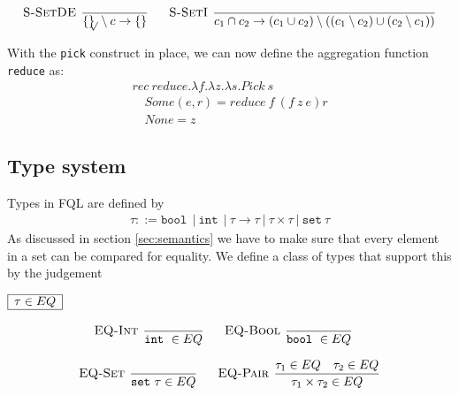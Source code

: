 \documentclass[a4paper]{article}
\newcommand{\code}[1]{{\tt #1}}
\newcommand{\pipe}{\ | \ }
\newcommand{\s}[1]{\mathtt{#1}}
\newcommand{\sLb}{\s{\{}}
\newcommand{\sRb}{\s{\}}}
\newcommand{\sbool}{\s{bool\ }}
\newcommand{\sint}{\s{int\ }}
\newcommand{\sseta}{\s{set\ }}
\newcommand{\strue}{\s{true}}
\newcommand{\sfalse}{\s{false}}
\newcommand{\sset}[1]{\sLb #1 \sRb}
\newcommand{\ssetc}[1]{\sset{#1}_{\!\!\!\surd}}
\newcommand{\step}{\to}
\newcommand{\dotset}[2]{\{#1,\ldots,#2\}}
\renewcommand{\rule}[3][]{\ \mbox{\textsc{#1 }}\dfrac{#2}{#3}\ }
\newcommand{\smbox}[1]{
  $\begin{array}{|c|}
    \hline
    #1 \\
    \hline
  \end{array}$
}
\begin{document}
\[\begin{array}{c}
{}
\quad\\\\
\rule[S-SetDE]{}{\ssetc{} \setminus c \step \sset{}}
\quad
\rule[S-SetI]{}{c_1 \cap c_2 \step (c_1 \cup c_2) \setminus ((c_1 \setminus c_2) \cup (c_2 \setminus c_1))}
\end{array}\]



With the \code{pick} construct in place, we can now define the aggregation function \code{reduce} as:
\[\begin{array}{l}
rec \  reduce.\lambda f.\lambda z.\lambda s.Pick \ s \\
\quad Some (e,r) = reduce \ f \ (f \  z \  e) r\\
\quad None = z
\end{array}\]

\subsection{Type system}
Types in FQL are defined by
\begin{eqnarray*}
\tau ::= \sbool \pipe \sint \pipe \tau \to \tau \pipe \tau \times \tau \pipe \sseta \tau
\end{eqnarray*}
As discussed in section \ref{sec:semantics} we have to make sure
that every element in a set can be compared for equality. We define
a class of types that support this by the judgement
\smbox{\tau \in EQ}
\[\begin{array}{c}
\rule[EQ-Int]{}{\sint \in EQ}\quad
\rule[EQ-Bool]{}{\sbool \in EQ}\quad\\\\
\rule[EQ-Set]{}{\sseta \tau \in EQ}\quad
\rule[EQ-Pair]{\tau_1 \in EQ \quad \tau_2 \in EQ}{\tau_1 \times \tau_2 \in EQ}
\end{array}\]
\end{document}
